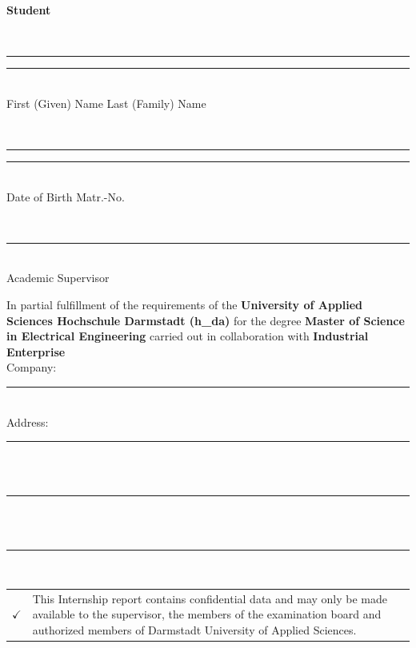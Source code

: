 \thispagestyle{empty} 
\textbf{\Large Student}
\par \vspace{5mm}
 \hspace{14mm}
\\
\rule[0ex]{0.45\textwidth}{0.4pt} %
\rule[0ex]{0.45\textwidth}{0.4pt}\\
First (Given) Name \hspace{55mm}
Last (Family) Name

\par \vspace{5mm}

 \hspace{14mm}
\\
\rule[0ex]{0.45\textwidth}{0.4pt} \hspace{14mm}
\rule[0ex]{0.45\textwidth}{0.4pt}\\
Date of Birth \hspace{66mm}
Matr.-No.


\par \vspace{5mm}
\makebox[0.55\textwidth][c]{\textbf{\myProf}}\\
\rule[0ex]{\textwidth}{0.4pt} \\
Academic Supervisor


\par \vspace{5mm} 
In partial fulfillment of the requirements of the \textbf{University of Applied Sciences Hochschule Darmstadt (h\_da)} for the degree \textbf{Master of Science in Electrical Engineering} carried out in collaboration with \textbf{Industrial Enterprise}\\[1ex]

Company: \\ 
\rule[0ex]{0.885\textwidth}{0.4pt}\\[2ex] 

Address: \\  
\rule[0ex]{0.9\textwidth}{0.4pt}\\[2ex]
\\  
\rule[0ex]{\textwidth}{0.4pt} \\[2ex]
\\  
\rule[0ex]{\textwidth}{0.4pt} \\[2ex]
\vspace{0.7cm}

\begin{table}[h]
	\begin{tabular}{lp{14.5cm}}
		$\checkmark$ & This Internship report contains confidential data and may only be made available to the supervisor, the members of the examination board and authorized members of Darmstadt University of Applied Sciences.
	\end{tabular}
\end{table}